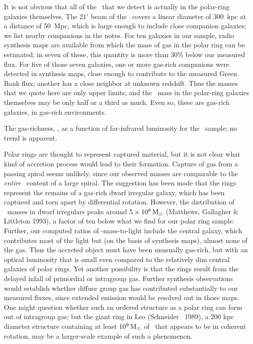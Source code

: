 It is not obvious that all of the \HI\ that we detect is actually in the 
polar-ring galaxies themselves.  
The $21'$ beam of the \ covers a linear diameter of
300~kpc at a distance of 50~Mpc, which is large enough to include close
companion galaxies; we list nearby companions in the notes. 
For ten galaxies in our sample, radio synthesis maps are available 
from which the mass of gas in the polar ring can be estimated; 
in seven of these, this quantity is more than 30\% below our measured flux.
For five of those seven galaxies, one or more gas-rich
companions were detected in synthesis maps, close enough to contribute 
to the measured Green Bank flux; another has a close neighbor at unknown 
redshift.
Thus the masses that we quote here are only upper limits, and the \HI\ 
mass in the polar-ring galaxies themselves may be only half or a third
as much.  Even so, these are gas-rich galaxies,
in gas-rich environments. 

\bigskip
\centerline{}

\medskip
{\tenpt 
   
The gas-richness, \MHILB, as a function of far-infrared 
luminosity for the \ sample; no trend is apparent.
}
\bigskip

Polar rings are thought to represent captured material, but 
it is not clear what kind of accretion process would lead to their formation.
Capture of gas from a passing spiral seems 
unlikely, since our observed masses are comparable to the {\it entire\/} 
\HI\ content of a large spiral.  
The suggestion has been made that the rings represent the remains of a
gas-rich dwarf irregular galaxy, which has been captured and torn apart
by differential rotation.  
However, the distribution of \HI\ masses in dwarf irregulars peaks
around $5 \times 10^8 {\,{\rm M}_\odot}$ (Matthews, Gallagher \& Littleton 1993), a
factor of ten below what we find for our polar ring sample.  
Further, our computed ratios of \HI-mass-to-light include the central
galaxy, which contributes most of the light but (on the basis of
synthesis maps), almost none of the gas.  
Thus the accreted object must have been 
unusually gas-rich, %
but with an optical luminosity that is small 
even compared to the relatively dim central galaxies of polar rings.    
Yet another possibility is that the 
rings result from the delayed infall of primordial or intragroup gas.
Further synthesis observations would establish whether diffuse group gas
has contributed substantially to our measured fluxes,
since extended emission would be resolved out in those maps.  
One might question whether such an ordered structure as a polar ring can 
form out of intragroup gas; but the giant ring in Leo (Schneider \etal\
1989), a 200 kpc diameter structure containing at least $10^9 {\,{\rm M}_\odot}$
of \HI\ that appears to be in coherent rotation, may be a 
larger-scale example of such a phenomenon.
  

